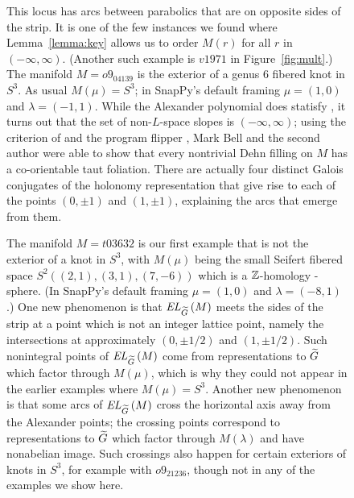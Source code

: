 \documentclass[tikz, sepfignums, defaultenums]{nmd/article}
\newcommand{\TEL}[1]{\mathit{EL}_\Gtil\left(#1\right)}
\begin{document}
\begin{figure}
  \begin{center}
  \end{center}

  \caption{This locus has arcs between parabolics that are on opposite
    sides of the strip.  It is one of the few instances we found where
    Lemma~\ref{lemma:key} allows us to order $M(r)$ for all $r$ in
    $(-\infty, \infty)$. (Another such example is $v1971$ in
    Figure~\ref{fig:mult}.)  The manifold $M = o9_{04139}$ is the
    exterior of a genus 6 fibered knot in $S^3$.  As usual
    $M(\mu) = S^3$; in SnapPy's default framing $\mu = (1,0)$ and
    $\lambda = (-1, 1)$.  While the Alexander polynomial does statisfy
    \cite[Corollary~1.3]{OSLensSpace2005}, it turns out that
    the set of non-$L$-space slopes is $(-\infty, \infty)$; using the
    criterion of \cite{Roberts2001} and the program flipper
    \cite{flipper}, Mark Bell and the second author were able to show
    that every nontrivial Dehn filling on $M$ has a co-orientable taut
    foliation.  There are actually four distinct Galois conjugates of
    the holonomy representation that give rise to each of the points
    $(0, \pm 1)$ and $(1, \pm 1)$, explaining the arcs that emerge
    from them. }
  \label{fig:o9_04139}
\end{figure}

\begin{figure}
  \begin{center}
  \end{center}

  \caption{The manifold $M = t03632$ is our first example that is not
    the exterior of a knot in $S^3$, with $M(\mu)$ being the small
    Seifert fibered space $S^2\left((2,1), (3, 1), (7, -6)\right)$
    which is a ${\mathbb Z}$-homology \3-sphere.  (In SnapPy's default framing
    $\mu = (1,0)$ and $\lambda = (-8, 1)$.)  One new phenomenon is that
    $\TEL{M}$ meets the sides of the strip at a point which is not an
    integer lattice point, namely the intersections at approximately
    $(0, \pm 1/2)$ and $(1, \pm 1/2)$.  Such nonintegral points of
    $\TEL{M}$ come from representations to $\Gtil$ which factor
    through $M(\mu)$, which is why they could not appear in the
    earlier examples where $M(\mu) = S^3$.  Another new phenomenon is
    that some arcs of $\TEL{M}$ cross the horizontal axis away from the
    Alexander points; the crossing points correspond to representations to $\Gtil$
    which factor through $M(\lambda)$ and have nonabelian image.  Such
    crossings also happen for certain exteriors of knots in $S^3$, for
    example with $o9_{21236}$, though not in any of the examples we
    show here.  }
  \label{fig:t03632}
\end{figure}
\end{document}
